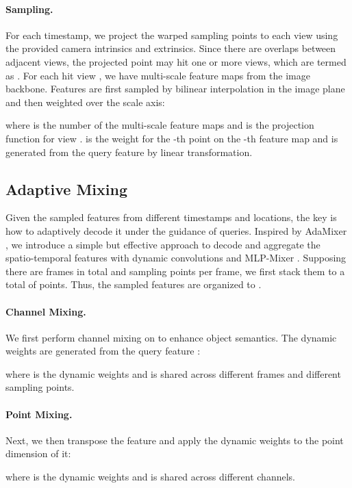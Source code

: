 \documentclass[10pt,twocolumn,letterpaper]{article}
\begin{document}
\vspace{-5pt}
\paragraph{Sampling.} For each timestamp, we project the warped sampling points  to each view using the provided camera intrinsics and extrinsics. Since there are overlaps between adjacent views, the projected point may hit one or more views, which are termed as . For each hit view , we have multi-scale feature maps  from the image backbone. Features are first sampled by bilinear interpolation  in the image plane and then weighted over the scale axis:

where  is the number of the multi-scale feature maps and  is the projection function for view .  is the weight for the -th point on the -th feature map and is generated from the query feature by linear transformation.

\subsection{Adaptive Mixing}

Given the sampled features from different timestamps and locations, the key is how to adaptively decode it under the guidance of queries. Inspired by AdaMixer \cite{adamixer}, we introduce a simple but effective approach to decode and aggregate the spatio-temporal features with dynamic convolutions \cite{dynamic_conv} and MLP-Mixer \cite{mlpmixer}.
Supposing there are  frames in total and  sampling points per frame, we first stack them to a total of  points. Thus, the sampled features are organized to .

\paragraph{Channel Mixing.} We first perform channel mixing on  to enhance object semantics. The dynamic weights are generated from the query feature :

where  is the dynamic weights and is shared across different frames and different sampling points.

\paragraph{Point Mixing.} Next, we then transpose the feature and apply the dynamic weights to the point dimension of it:

where  is the dynamic weights and is shared across different channels.
\end{document}
